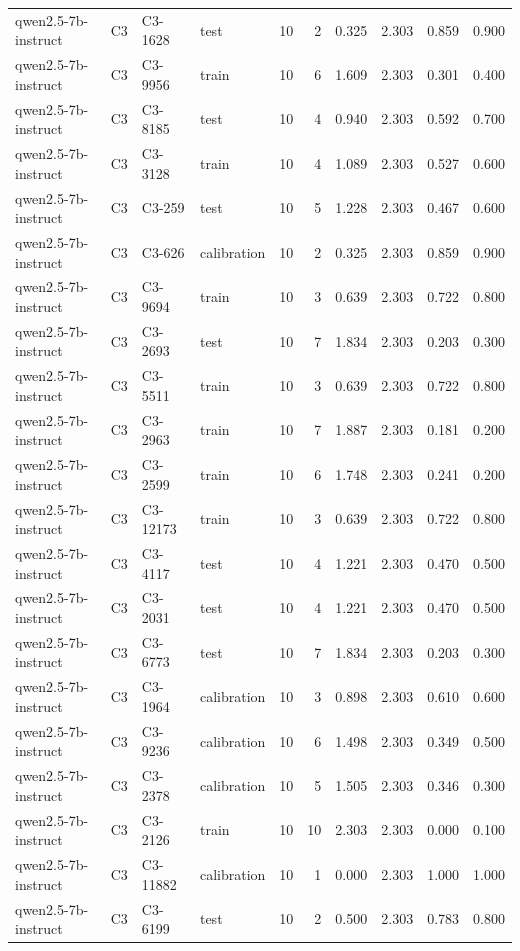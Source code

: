 \begin{table}
\begin{tabular}{llllrrrrrr}
qwen2.5-7b-instruct & C3 & C3-1628 & test & 10 & 2 & 0.325 & 2.303 & 0.859 & 0.900 \\
qwen2.5-7b-instruct & C3 & C3-9956 & train & 10 & 6 & 1.609 & 2.303 & 0.301 & 0.400 \\
qwen2.5-7b-instruct & C3 & C3-8185 & test & 10 & 4 & 0.940 & 2.303 & 0.592 & 0.700 \\
qwen2.5-7b-instruct & C3 & C3-3128 & train & 10 & 4 & 1.089 & 2.303 & 0.527 & 0.600 \\
qwen2.5-7b-instruct & C3 & C3-259 & test & 10 & 5 & 1.228 & 2.303 & 0.467 & 0.600 \\
qwen2.5-7b-instruct & C3 & C3-626 & calibration & 10 & 2 & 0.325 & 2.303 & 0.859 & 0.900 \\
qwen2.5-7b-instruct & C3 & C3-9694 & train & 10 & 3 & 0.639 & 2.303 & 0.722 & 0.800 \\
qwen2.5-7b-instruct & C3 & C3-2693 & test & 10 & 7 & 1.834 & 2.303 & 0.203 & 0.300 \\
qwen2.5-7b-instruct & C3 & C3-5511 & train & 10 & 3 & 0.639 & 2.303 & 0.722 & 0.800 \\
qwen2.5-7b-instruct & C3 & C3-2963 & train & 10 & 7 & 1.887 & 2.303 & 0.181 & 0.200 \\
qwen2.5-7b-instruct & C3 & C3-2599 & train & 10 & 6 & 1.748 & 2.303 & 0.241 & 0.200 \\
qwen2.5-7b-instruct & C3 & C3-12173 & train & 10 & 3 & 0.639 & 2.303 & 0.722 & 0.800 \\
qwen2.5-7b-instruct & C3 & C3-4117 & test & 10 & 4 & 1.221 & 2.303 & 0.470 & 0.500 \\
qwen2.5-7b-instruct & C3 & C3-2031 & test & 10 & 4 & 1.221 & 2.303 & 0.470 & 0.500 \\
qwen2.5-7b-instruct & C3 & C3-6773 & test & 10 & 7 & 1.834 & 2.303 & 0.203 & 0.300 \\
qwen2.5-7b-instruct & C3 & C3-1964 & calibration & 10 & 3 & 0.898 & 2.303 & 0.610 & 0.600 \\
qwen2.5-7b-instruct & C3 & C3-9236 & calibration & 10 & 6 & 1.498 & 2.303 & 0.349 & 0.500 \\
qwen2.5-7b-instruct & C3 & C3-2378 & calibration & 10 & 5 & 1.505 & 2.303 & 0.346 & 0.300 \\
qwen2.5-7b-instruct & C3 & C3-2126 & train & 10 & 10 & 2.303 & 2.303 & 0.000 & 0.100 \\
qwen2.5-7b-instruct & C3 & C3-11882 & calibration & 10 & 1 & 0.000 & 2.303 & 1.000 & 1.000 \\
qwen2.5-7b-instruct & C3 & C3-6199 & test & 10 & 2 & 0.500 & 2.303 & 0.783 & 0.800 \\

\end{tabular}
\end{table}
